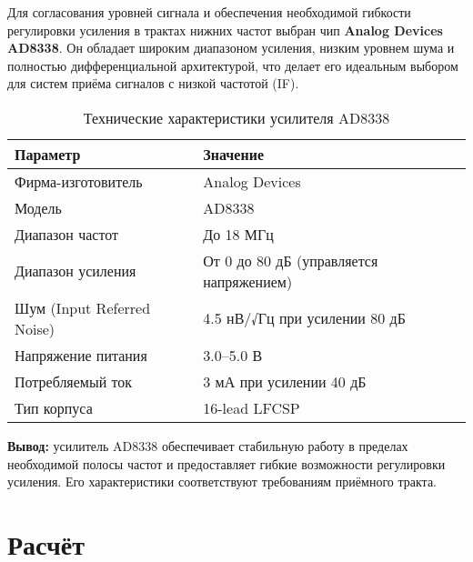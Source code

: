 \documentclass[a4paper,12pt]{article}
\begin{document}
Для согласования уровней сигнала и обеспечения необходимой гибкости регулировки усиления в трактах нижних частот выбран чип \textbf{Analog Devices AD8338}. Он обладает широким диапазоном усиления, низким уровнем шума и полностью дифференциальной архитектурой, что делает его идеальным выбором для систем приёма сигналов с низкой частотой (IF).

\begin{table}[H]
\centering
\caption{Технические характеристики усилителя AD8338}
\begin{tabular}{|l|l|}
\hline
\textbf{Параметр} & \textbf{Значение} \\ \hline
Фирма-изготовитель & Analog Devices \\ \hline
Модель & AD8338 \\ \hline
Диапазон частот & До 18 МГц \\ \hline
Диапазон усиления & От 0 до 80 дБ (управляется напряжением) \\ \hline
Шум (Input Referred Noise) & 4.5 нВ/√Гц при усилении 80 дБ \\ \hline
Напряжение питания & 3.0–5.0 В \\ \hline
Потребляемый ток & 3 мА при усилении 40 дБ \\ \hline
Тип корпуса & 16-lead LFCSP \\ \hline
\end{tabular}
\end{table}

\textbf{Вывод:} усилитель AD8338 обеспечивает стабильную работу в пределах необходимой полосы частот и предоставляет гибкие возможности регулировки усиления. Его характеристики соответствуют требованиям приёмного тракта.


























\newpage
\section{Расчёт}
\end{document}
